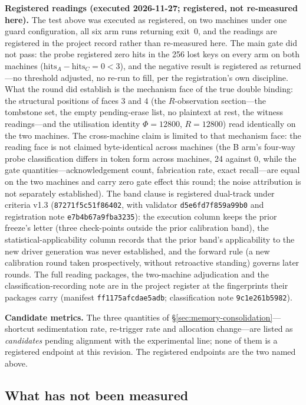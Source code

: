 \documentclass[11pt,a4paper]{article}
\begin{document}
\textbf{Registered readings (executed 2026-11-27; registered, not re-measured here).} The test above was executed as registered, on two machines under one guard configuration, all six arm runs returning exit~0, and the readings are registered in the project record rather than re-measured here. The main gate did not pass: the probe registered zero hits in the 256 lost keys on every arm on both machines ($\mathrm{hits}_A - \mathrm{hits}_C = 0 < 3$), and the negative result is registered as returned---no threshold adjusted, no re-run to fill, per the registration's own discipline. What the round did establish is the mechanism face of the true double binding: the structural positions of faces 3 and 4 (the $R$-observation section---the tombstone set, the empty pending-erase list, no plaintext at rest, the witness readings---and the utilisation identity $\Phi = 12800$, $R = 12800$) read identically on the two machines. The cross-machine claim is limited to that mechanism face: the reading face is not claimed byte-identical across machines (the B arm's four-way probe classification differs in token form across machines, 24 against 0, while the gate quantities---acknowledgement count, fabrication rate, exact recall---are equal on the two machines and carry zero gate effect this round; the noise attribution is not separately established). The band clause is registered dual-track under criteria v1.3 (\texttt{87271f5c51f86402}, with validator \texttt{d5e6fd7f859a99b0} and registration note \texttt{e7b4b67a9fba3235}): the execution column keeps the prior freeze's letter (three check-points outside the prior calibration band), the statistical-applicability column records that the prior band's applicability to the new driver generation was never established, and the forward rule (a new calibration round taken prospectively, without retroactive standing) governs later rounds. The full reading packages, the two-machine adjudication and the classification-recording note are in the project register at the fingerprints their packages carry (manifest \texttt{ff1175afcdae5adb}; classification note \texttt{9c1e261b5982}).

\textbf{Candidate metrics.} The three quantities of \S\ref{sec:memory-consolidation}---shortcut sedimentation rate, re-trigger rate and allocation change---are listed as \emph{candidates} pending alignment with the experimental line; none of them is a registered endpoint at this revision. The registered endpoints are the two named above.

\subsection{What has not been measured}
\label{sec:empirics-unmeasured}
\end{document}
